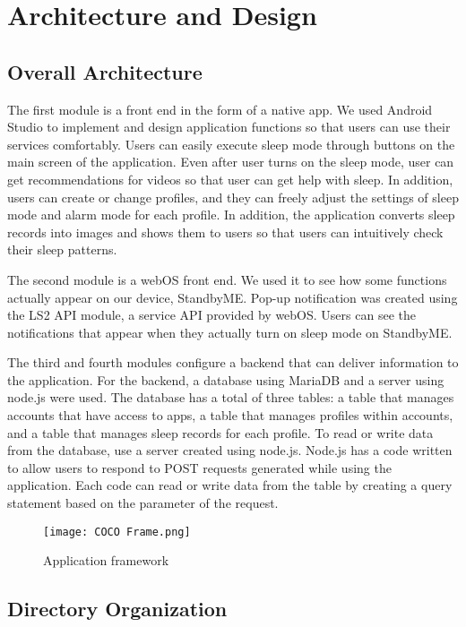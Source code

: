 \documentclass[conference]{IEEEtran}
\begin{document}
\section{Architecture and Design}

\subsection{Overall Architecture}

The first module is a front end in the form of a native app. We used Android Studio to implement and design application functions so that users can use their services comfortably. Users can easily execute sleep mode through buttons on the main screen of the application. Even after user turns on the sleep mode, user can get recommendations for videos so that user can get help with sleep. In addition, users can create or change profiles, and they can freely adjust the settings of sleep mode and alarm mode for each profile. In addition, the application converts sleep records into images and shows them to users so that users can intuitively check their sleep patterns.\break
\par The second module is a webOS front end. We used it to see how some functions actually appear on our device, StandbyME. Pop-up notification was created using the LS2 API module, a service API provided by webOS. Users can see the notifications that appear when they actually turn on sleep mode on StandbyME.\break
\par The third and fourth modules configure a backend that can deliver information to the application. For the backend, a database using MariaDB and a server using node.js were used. The database has a total of three tables: a table that manages accounts that have access to apps, a table that manages profiles within accounts, and a table that manages sleep records for each profile. To read or write data from the database, use a server created using node.js. Node.js has a code written to allow users to respond to POST requests generated while using the application. Each code can read or write data from the table by creating a query statement based on the parameter of the request.

\begin{figure}[H]
\texttt{[image: COCO Frame.png]}
\centering
\caption{Application framework}
\end{figure}

\subsection{Directory Organization}
\end{document}
